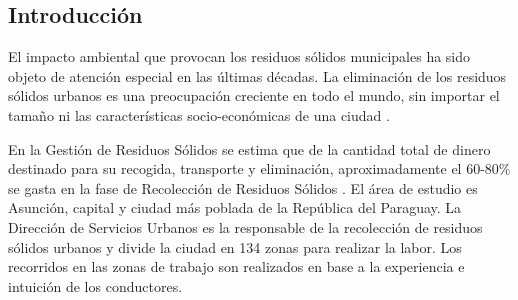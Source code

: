 \documentclass[a0,portrait, final]{a0poster}
\begin{document}
\vspace{1cm} %


\begin{multicols}{2} %





\section*{Introducci\'on}

El impacto ambiental que provocan los residuos sólidos municipales ha sido objeto de atención especial en las últimas décadas. La eliminación de los residuos sólidos urbanos es una preocupación creciente en todo el mundo, sin importar el tamaño ni las características socio-económicas de una ciudad \cite{Karadimas2007OptimalAlgorithm}. 

En la Gestión de Residuos Sólidos se estima que de la cantidad total de dinero destinado para su recogida, transporte y eliminación, aproximadamente el 60-80\% se gasta en la fase de Recolección de Residuos Sólidos \cite{Tavares2009OptimisationModelling}. 
El área de estudio es Asunción, capital y ciudad más poblada de la República del Paraguay. La Dirección de Servicios Urbanos es la responsable de la recolección de residuos sólidos urbanos y divide la ciudad en 134 zonas para realizar la labor. Los recorridos en las zonas de trabajo son realizados en base a la experiencia e intuición de los conductores.



\end{multicols}
\end{document}
